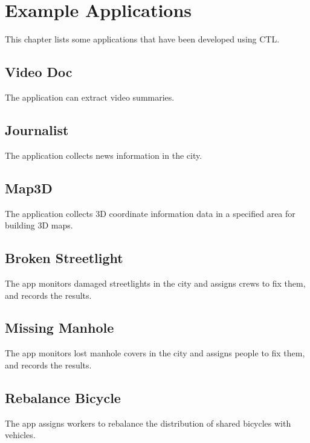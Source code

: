 \chapter{Example Applications}
This chapter lists some applications that have been developed using CTL.

\section{Video Doc}
The application can extract video summaries.


\section{Journalist}
The application collects news information in the city.


\section{Map3D}
The application collects 3D coordinate information data in a specified area for building 3D maps.


\section{Broken Streetlight}
The app monitors damaged streetlights in the city and assigns crews to fix them, and records the results.


\section{Missing Manhole}
The app monitors lost manhole covers in the city and assigns people to fix them, and records the results.


\section{Rebalance Bicycle}
The app assigns workers to rebalance the distribution of shared bicycles with vehicles.


